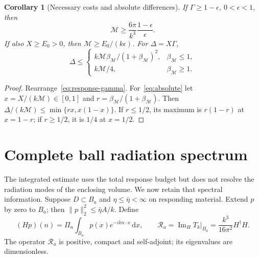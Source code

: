 \documentclass[11pt]{article}
\newtheorem{corollary}[theorem]{Corollary}
\newcommand{\ImH}{\operatorname{Im}_{\!H}}
\newcommand{\dd}{\,\mathrm{d}}
\newcommand{\norm}[1]{\lVert #1\rVert}
\begin{document}
\begin{corollary}[Necessary costs and absolute differences]\label{cor:costs}
If $\Gamma\geq1-\epsilon$, $0<\epsilon<1$, then
\begin{equation}\label{eq:costs}
 \mathcal M\geq\frac{6\pi}{k^3}\frac{1-\epsilon}{\epsilon}.
\end{equation}
If also $X\geq E_0>0$, then $\mathcal M\geq E_0/(k\epsilon)$. For $\Delta=X\Gamma$,
\begin{equation}\label{eq:absolute}
 \Delta\leq
 \begin{cases}
 k\mathcal M\beta_{\mathcal M}/(1+\beta_{\mathcal M})^2,&\beta_{\mathcal M}\leq1,\\
 k\mathcal M/4,&\beta_{\mathcal M}\geq1.
 \end{cases}
\end{equation}
\end{corollary}
\begin{proof}
Rearrange~\eqref{eq:response-gamma}. For~\eqref{eq:absolute} let $x=X/(k\mathcal M)\in[0,1]$ and $r=\beta_{\mathcal M}/(1+\beta_{\mathcal M})$. Then $\Delta/(k\mathcal M)\leq\min\{rx,x(1-x)\}$. If $r\leq1/2$, its maximum is $r(1-r)$ at $x=1-r$; if $r\geq1/2$, it is $1/4$ at $x=1/2$.
\end{proof}

\section{Complete ball radiation spectrum}\label{sec:spectrum}
The integrated estimate uses the total response budget but does not resolve the radiation modes of the enclosing volume. We now retain that spectral information. Suppose $D\subset B_a$ and $\eta\leq\bar\eta<\infty$ on responding material. Extend $p$ by zero to $B_a$; then $\norm p_2^2\leq\bar\eta A/k$. Define
\begin{equation}\label{eq:angular-operator}
 (Hp)(n)=\Pi_n\int_{B_a}p(x)e^{-ikn\cdot x}\dd x,\qquad
 \mathcal R_a=\ImH T_k\big|_{B_a}=\frac{k^3}{16\pi^2}H^\dagger H.
\end{equation}
The operator $\mathcal R_a$ is positive, compact and self-adjoint; its eigenvalues are dimensionless.
\end{document}
